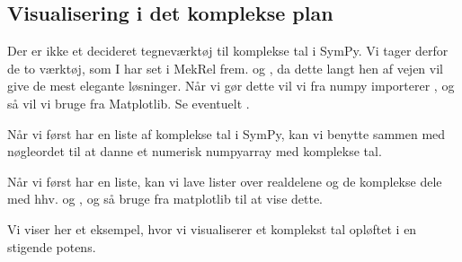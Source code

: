 \documentclass[letterpaper,10pt,english]{jupyterBook}
\begin{document}
\subsection{Visualisering i det komplekse plan}
\label{\detokenize{notebooks/sympy/Notebook_kompleks:visualisering-i-det-komplekse-plan}}
Der er ikke et decideret tegneværktøj til komplekse tal i SymPy. Vi tager derfor de to værktøj, som I har set i MekRel frem.  og , da dette langt hen af vejen vil give de mest elegante løsninger. Når vi gør dette vil vi fra numpy importerer , og så vil vi bruge  fra Matplotlib. Se eventuelt {\hyperref[\detokenize{notebooks/MekRel/Intro_til_MekRel::doc}]{}}.

Når vi først har en liste af komplekse tal i SymPy, kan vi benytte  sammen med nøgleordet  til at danne et numerisk numpy\sphinxhyphen{}array med komplekse tal.

Når vi først har en liste, kan vi lave lister over real\sphinxhyphen{}delene og de komplekse dele med hhv.  og , og så bruge  fra matplotlib til at vise dette.

Vi viser her et eksempel, hvor vi visualiserer et komplekst tal opløftet i en stigende potens.

\begin{sphinxVerbatim}[commandchars=\\\{\}]
    

  \PYG{p}{[}\PYG{p}{]}
    
      
    
\end{sphinxVerbatim}

\begin{sphinxVerbatim}
\end{sphinxVerbatim}
\end{document}
